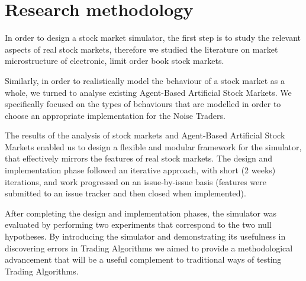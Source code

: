 \section{Research methodology}

In order to design a stock market simulator, the first step is to study the relevant aspects of real stock markets, therefore we studied the literature on market microstructure of electronic, limit order book stock markets.

Similarly, in order to realistically model the behaviour of a stock market as a whole, we turned to analyse existing Agent-Based Artificial Stock Markets. We specifically focused on the types of behaviours that are modelled in order to choose an appropriate implementation for the Noise Traders.

The results of the analysis of stock markets and Agent-Based Artificial Stock Markets enabled us to design a flexible and modular framework for the simulator, that effectively mirrors the features of real stock markets. The design and implementation phase followed an iterative approach, with short (2 weeks) iterations, and work progressed on an issue-by-issue basis (features were submitted to an issue tracker and then closed when implemented).

After completing the design and implementation phases, the simulator was evaluated by performing two experiments that correspond to the two null hypotheses. By introducing the simulator and demonstrating its usefulness in discovering errors in Trading Algorithms we aimed to provide a methodological advancement that will be a useful complement to traditional ways of testing Trading Algorithms.
